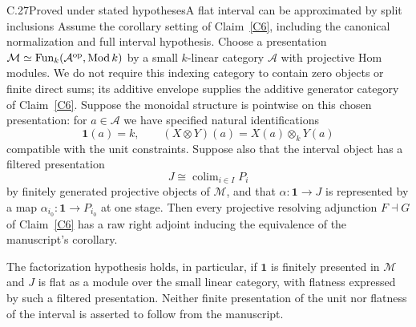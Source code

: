 \begin{claim}{C.27}{Proved under stated hypotheses}{A flat interval can be approximated by split inclusions}\label{C27}
Assume the corollary setting of Claim~\ref{C6}, including the canonical normalization and full interval hypothesis. Choose a presentation $\mathcal M\simeq\operatorname{Fun}_k(\mathcal A^{\mathrm{op}},\operatorname{Mod} k)$ by a small $k$-linear category $\mathcal A$ with projective Hom modules. We do not require this indexing category to contain zero objects or finite direct sums; its additive envelope supplies the additive generator category of Claim~\ref{C6}. Suppose the monoidal structure is pointwise on this chosen presentation: for $a\in\mathcal A$ we have specified natural identifications
\[
 \mathbf1(a)=k,\qquad (X\otimes Y)(a)=X(a)\otimes_kY(a)
\]
compatible with the unit constraints. Suppose also that the interval object has a filtered presentation
\[
 J\cong\mathop{\mathrm{colim}}_{i\in I}P_i
\]
by finitely generated projective objects of $\mathcal M$, and that $\alpha:\mathbf1\to J$ is represented by a map $\alpha_{i_0}:\mathbf1\to P_{i_0}$ at one stage. Then every projective resolving adjunction $F\dashv G$ of Claim~\ref{C6} has a raw right adjoint inducing the equivalence of the manuscript's corollary.

The factorization hypothesis holds, in particular, if $\mathbf1$ is finitely presented in $\mathcal M$ and $J$ is flat as a module over the small linear category, with flatness expressed by such a filtered presentation. Neither finite presentation of the unit nor flatness of the interval is asserted to follow from the manuscript.
\end{claim}
